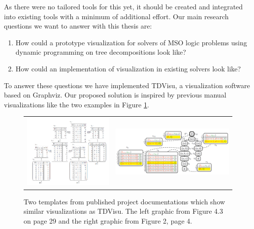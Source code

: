 \documentclass[a4paper, 12pt, bibliography=totoc]{scrartcl}
\begin{document}
As there were no tailored tools for this yet, it should be created and integrated into existing tools with a minimum of additional effort.
Our main research questions we want to answer with this thesis are:
\begin{enumerate}
	\item How could a prototype visualization for solvers of MSO logic problems using dynamic programming on tree decompositions look like?
	\item How could an implementation of visualization in existing solvers look like?
\end{enumerate}
\noindent
To answer these questions we have implemented TDVisu, a visualization software based on Graphviz. 
Our proposed solution is inspired by previous manual visualizations like the two examples in Figure \ref{fig:prevvisus}.
\begin{figure}[h]
	
	\centering
	\begin{tabularx}{\textwidth}{ X X }
		\includegraphics[width=1.05\linewidth,valign=c]{images/DualDA43.png} &  
		\includegraphics[width=1.02\linewidth,valign=c]{images/dpdbVisuSat.png}\\ 
		
	\end{tabularx}	
	\label{fig:prevvisus}
	\caption{Two templates from published project documentations which show similar visualizations as TDVisu. The left graphic from \cite{DiplomarbeitZisser} Figure 4.3 on page 29 and the right graphic from \cite{dpdbpadl2020} Figure 2, page 4.}
	
\end{figure}
\end{document}
